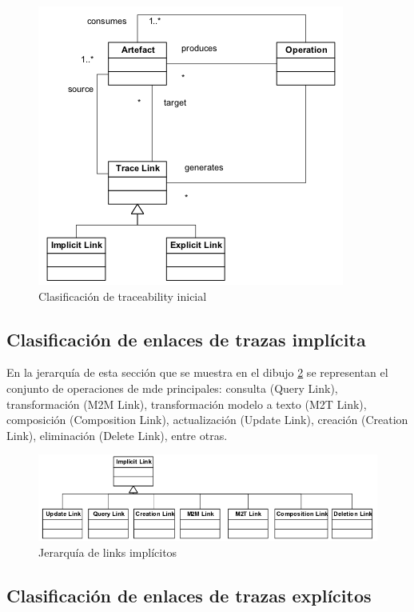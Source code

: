 \documentclass[a4paper,12pt,oneside,spanish]{book}
\begin{document}
\begin{figure}[hbtp]
\centering
\includegraphics[scale=0.75]{./img/ExplicitImplicitTraceLinkClassification}
\caption{Clasificación de traceability inicial}
\label{fig:ClasifInicial}
\end{figure}

\subsection{Clasificación de enlaces de trazas implícita}

En la jerarquía de esta sección que se muestra en el dibujo \ref{fig:LinksImplicitos} se representan el conjunto de operaciones de \gls{mde} principales: consulta (Query Link), transformación (M2M Link), transformación modelo a texto (M2T Link), composición (Composition Link), actualización (Update Link), creación (Creation Link), eliminación (Delete Link), entre otras.


\begin{figure}[hbtp]
\centering
\includegraphics[scale=0.55]{./img/ImplicitTraceLinks}
\caption{Jerarquía de links implícitos}
\label{fig:LinksImplicitos}
\end{figure}


\subsection{Clasificación de enlaces de trazas explícitos}
\end{document}
